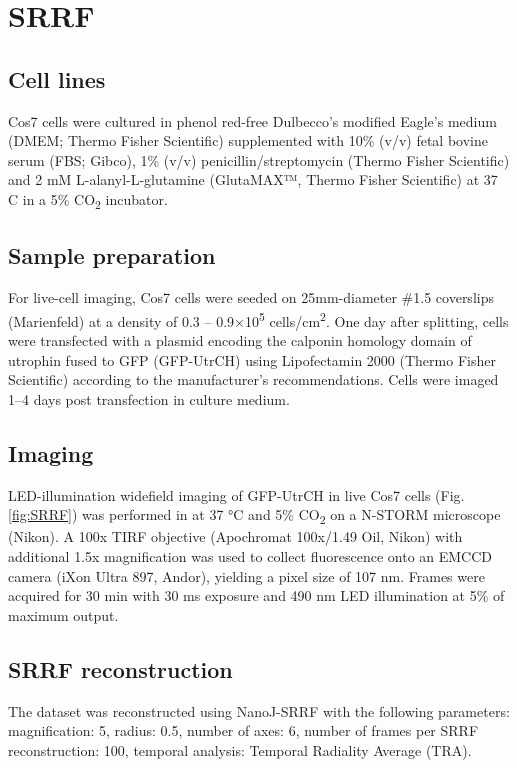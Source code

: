 \section{SRRF}

\subsection{Cell lines}

Cos7 cells were cultured in phenol red-free Dulbecco’s modified Eagle’s medium (DMEM; Thermo Fisher Scientific) supplemented with 10\% (v/v) fetal bovine serum (FBS; Gibco), 1\% (v/v) penicillin/streptomycin (Thermo Fisher Scientific) and 2 mM L-alanyl-L-glutamine (GlutaMAX™, Thermo Fisher Scientific) at 37 \degree C in a 5\% CO\textsubscript{2} incubator.

\subsection{Sample preparation}

For live-cell imaging, Cos7 cells were seeded on 25mm-diameter \#1.5 coverslips (Marienfeld) at a density of 0.3 – 0.9×10\textsuperscript{5} cells/cm\textsuperscript{2}. One day after splitting, cells were transfected with a plasmid encoding the calponin homology domain of utrophin fused to GFP (GFP-UtrCH) \cite{burkel2007versatile} using Lipofectamin 2000 (Thermo Fisher Scientific) according to the manufacturer’s recommendations. Cells were imaged 1–4 days post transfection in culture medium.

\subsection{Imaging}

LED-illumination widefield imaging of GFP-UtrCH in live Cos7 cells (Fig. \ref{fig:SRRF}) was performed in at 37 °C and 5\% CO\textsubscript{2} on a N-STORM microscope (Nikon). A 100x TIRF objective (Apochromat 100x/1.49 Oil, Nikon) with additional 1.5x magnification was used to collect fluorescence onto an EMCCD camera (iXon Ultra 897, Andor), yielding a pixel size of 107 nm. Frames were acquired for 30 min with 30 ms exposure and 490 nm LED illumination at 5\% of maximum output. 

\subsection{SRRF reconstruction}

The dataset was reconstructed using NanoJ-SRRF with the following parameters: magnification: 5, radius: 0.5, number of axes: 6,  number of frames per SRRF reconstruction: 100, temporal analysis: Temporal Radiality Average (TRA). 


